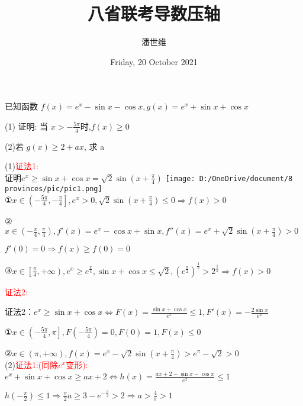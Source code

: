 \documentclass[a4paper,12pt]{article}
\begin{document}
\title {八省联考导数压轴}
\author{潘世维}
\date{Friday, 20 October 2021}
\maketitle

已知函数 $ f(x)=e^{x}-\sin x-\cos x, g(x)=e^{x}+\sin x+\cos x$


(1) 证明: 当 $ x>-\frac{5 \pi}{4}  $时,$  f(x) \geq 0 $



(2)若 $ g(x) \geq 2+a x $, 求  a 
\begin{flushleft}

(1)\textcolor{red}{证法1:}\\
证明$e^x \ge \sin x + \cos x = \sqrt 2 \sin \left( x + \frac{\pi }{4} \right) $
\texttt{[image: D:/OneDrive/document/8 provinces/pic/pic1.png]}\\
①$x \in \left( { - \frac{{5\pi }}{4}, - \frac{\pi }{4}} \right],{e^x} > 0,\sqrt 2 \sin \left( {x + \frac{\pi }{4}} \right) \le 0 \Rightarrow f(x) > 0$

②$x \in \left( { - \frac{\pi }{4},\frac{\pi }{4}} \right),f'(x) = {e^x} - \cos x + \sin x,f''(x) = {e^x} + \sqrt 2 \sin \left( {x + \frac{\pi }{4}} \right) > 0$

$  f'(0) = 0 \Rightarrow f(x) \ge f(0) = 0$

③$\left. {x \in \left[ {\frac{\pi }{4}, + \infty } \right.} \right),{e^x} \ge {e^{\frac{\pi }{4}}},\sin x + \cos x \le \sqrt 2 ,{\left( {{e^{\frac{\pi }{2}}}} \right)^{\frac{1}{2}}} > {2^{\frac{1}{2}}} \Rightarrow f(x) > 0$

\textcolor{red}{证法2:}

证法2：$e^x \ge \sin x + \cos x \Leftrightarrow F(x) = \frac{{\sin x + \cos x}}{{{e^x}}} \le 1 ,F'(x) =  - \frac{{2\sin x}}{{{e^x}}}$

①$x \in \left. {\left( { - \frac{{5\pi }}{4},\pi } \right.} \right],F( - \frac{{5\pi }}{4}) = 0,F(0) = 1,F(x) \le 0$

②$\left. {x \in \left( \pi , + \infty  \right.} \right),f(x) = {e^x} - \sqrt 2 \sin (x + \frac{\pi }{4}) > {e^\pi } - \sqrt 2  > 0$
\\(2)\textcolor{red}{证法1:(同除$e^x$变形):}${e^x} + \sin x + \cos x \ge ax + 2 \Leftrightarrow h(x) = \frac{{ax + 2 - \sin x - \cos x}}{{{e^x}}} \le 1$

$h\left( { - \frac{\pi }{2}} \right) \le 1 \Rightarrow \frac{\pi }{2}a \ge 3 - {e^{ - \frac{\pi }{2}}} > 2 \Rightarrow a > \frac{4}{\pi } >1 $


\end{flushleft}
\end{document}
